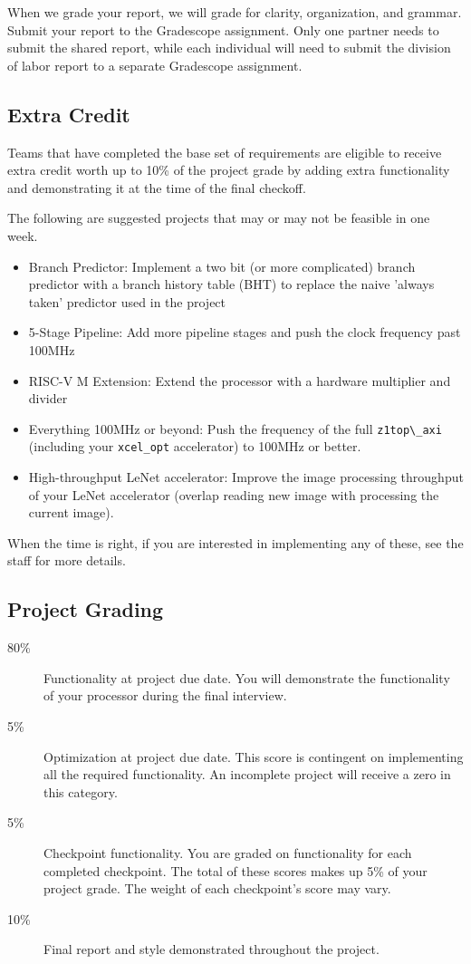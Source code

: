 \documentclass[11pt]{article}
\begin{document}
When we grade your report, we will grade for clarity, organization, and grammar.
Submit your report to the Gradescope assignment.
Only one partner needs to submit the shared report, while each individual will need to submit the division of labor report to a separate Gradescope assignment.

\subsection{Extra Credit}
\label{extra_credit}
Teams that have completed the base set of requirements are eligible to receive extra credit worth up to 10\% of the project grade by adding extra functionality and demonstrating it at the time of the final checkoff.

The following are suggested projects that may or may not be feasible in one week.
\begin{itemize}
  \item Branch Predictor: Implement a two bit (or more complicated) branch predictor with a branch history table (BHT) to replace the naive 'always taken' predictor used in the project
  \item 5-Stage Pipeline: Add more pipeline stages and push the clock frequency past 100MHz
  \item RISC-V M Extension: Extend the processor with a hardware multiplier and divider
  \item Everything 100MHz or beyond: Push the frequency of the full \verb|z1top\_axi| (including your \verb|xcel_opt| accelerator) to 100MHz or better.
  \item High-throughput LeNet accelerator: Improve the image processing throughput of your LeNet accelerator (overlap reading new image with processing the current image).
\end{itemize}

When the time is right, if you are interested in implementing any of these, see the staff for more details.

\subsection{Project Grading}
\label{deadlinegrading}

\begin{description}
  \item[80\%] {Functionality} at project due date. You will demonstrate the functionality of your processor during the final interview.
  \item[5\%] {Optimization} at project due date. This score is contingent on implementing all the required functionality. An incomplete project will receive a zero in this category.
  \item[5\%] {Checkpoint} functionality. You are graded on functionality for each completed checkpoint. The total of these scores makes up 5\% of your project grade. The weight of each checkpoint's score may vary.
  \item[10\%] {Final report} and {style} demonstrated throughout the project.
\end{description}
\end{document}
